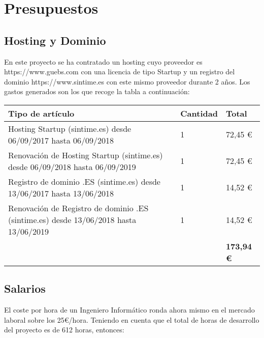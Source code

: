 \setcounter{chapter}{3}
\setcounter{section}{0}
\setcounter{subsection}{0}
\chapter{Presupuestos}

\section{Hosting y Dominio}

En este proyecto se ha contratado un hosting cuyo proveedor es https://www.guebs.com con una licencia de tipo Startup y un registro del dominio https://www.sintime.es con este mismo proveedor durante 2 años. Los gastos generados son los que recoge la tabla a continuación:\\

\begin{table}[h]
	\centering
	\begin{tabular}{| p{10cm} | p{1.6cm} | p{2.3cm} |}
		\rowcolor[HTML]{329A9D} 
		{\color[HTML]{FFFFFF} \textbf{Tipo de artículo}} & {\color[HTML]{FFFFFF} \textbf{Cantidad}} & {\color[HTML]{FFFFFF} \textbf{Total}} \\ \hline
		Hosting Startup (sintime.es) desde 06/09/2017 hasta 06/09/2018 & 1 & 72,45 \euro \\ \hline 
		Renovación de Hosting Startup (sintime.es) desde 06/09/2018 hasta 06/09/2019 & 1 & 72,45 \euro \\ \hline
		Registro de dominio .ES (sintime.es) desde 13/06/2017 hasta 13/06/2018 & 1 & 14,52 \euro \\ \hline
		Renovación de Registro de dominio .ES (sintime.es) desde 13/06/2018 hasta 13/06/2019 & 1 & 14,52 \euro \\ \hline
		 &  & \textbf{173,94 \euro }\\ \hline
	\end{tabular}
\end{table}

\newpage

\section{Salarios}

El coste por hora de un Ingeniero Informático ronda ahora mismo en el mercado laboral sobre los 25\euro/hora. Teniendo en cuenta que el total de horas de desarrollo del proyecto es de 612 horas, entonces:\\

